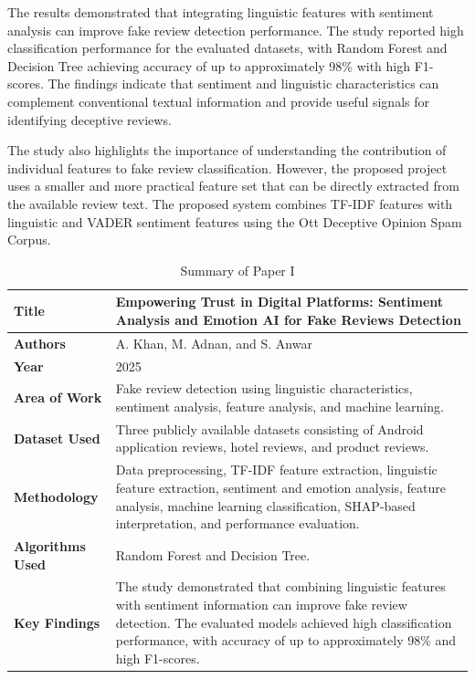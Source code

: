 \documentclass[12pt,a4paper]{report}
\begin{document}
The results demonstrated that integrating linguistic features with sentiment analysis can improve fake review detection performance. The study reported high classification performance for the evaluated datasets, with Random Forest and Decision Tree achieving accuracy of up to approximately 98\% with high F1-scores. The findings indicate that sentiment and linguistic characteristics can complement conventional textual information and provide useful signals for identifying deceptive reviews.

The study also highlights the importance of understanding the contribution of individual features to fake review classification. However, the proposed project uses a smaller and more practical feature set that can be directly extracted from the available review text. The proposed system combines TF-IDF features with linguistic and VADER sentiment features using the Ott Deceptive Opinion Spam Corpus.

\begin{table}[H]
\centering
\small
\renewcommand{\arraystretch}{1.3}

\begin{tabularx}{0.95\textwidth}{|>{\raggedright\arraybackslash}p{}|X|}
\hline
\textbf{Title} &
Empowering Trust in Digital Platforms: Sentiment Analysis and Emotion AI for Fake Reviews Detection \\
\hline

\textbf{Authors} &
A. Khan, M. Adnan, and S. Anwar \\
\hline

\textbf{Year} &
2025 \\
\hline

\textbf{Area of Work} &
Fake review detection using linguistic characteristics, sentiment analysis, feature analysis, and machine learning. \\
\hline

\textbf{Dataset Used} &
Three publicly available datasets consisting of Android application reviews, hotel reviews, and product reviews. \\
\hline

\textbf{Methodology} &
Data preprocessing, TF-IDF feature extraction, linguistic feature extraction, sentiment and emotion analysis, feature analysis, machine learning classification, SHAP-based interpretation, and performance evaluation. \\
\hline

\textbf{Algorithms Used} &
Random Forest and Decision Tree. \\
\hline

\textbf{Key Findings} &
The study demonstrated that combining linguistic features with sentiment information can improve fake review detection. The evaluated models achieved high classification performance, with accuracy of up to approximately 98\% and high F1-scores. \\
\hline

\end{tabularx}

\caption{Summary of Paper I}
\label{tab:paper1}
\end{table}
\end{document}
